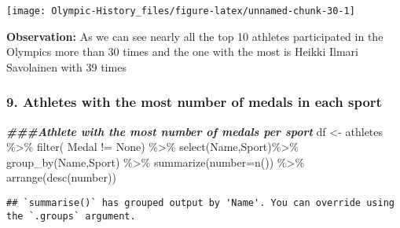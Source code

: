 \documentclass[
]{article}
\newenvironment{Shaded}{\begin{snugshade}}{\end{snugshade}}
\newcommand{\AttributeTok}[1]{\textcolor[rgb]{0.77,0.63,0.00}{#1}}
\newcommand{\DecValTok}[1]{\textcolor[rgb]{0.00,0.00,0.81}{#1}}
\newcommand{\DocumentationTok}[1]{\textcolor[rgb]{0.56,0.35,0.01}{\textbf{\textit{#1}}}}
\newcommand{\FunctionTok}[1]{\textcolor[rgb]{0.00,0.00,0.00}{#1}}
\newcommand{\NormalTok}[1]{#1}
\newcommand{\OtherTok}[1]{\textcolor[rgb]{0.56,0.35,0.01}{#1}}
\newcommand{\SpecialCharTok}[1]{\textcolor[rgb]{0.00,0.00,0.00}{#1}}
\newcommand{\StringTok}[1]{\textcolor[rgb]{0.31,0.60,0.02}{#1}}
\begin{document}
\begin{flushleft}\texttt{[image: Olympic-History\_files/figure-latex/unnamed-chunk-30-1]} \end{flushleft}

\textbf{Observation:} As we can see nearly all the top 10 athletes
participated in the Olympics more than 30 times and the one with the
most is Heikki Ilmari Savolainen with 39 times

\hypertarget{athletes-with-the-most-number-of-medals-in-each-sport}{%
\subsubsection{9. Athletes with the most number of medals in each
sport}\label{athletes-with-the-most-number-of-medals-in-each-sport}}

\begin{Shaded}
\begin{Highlighting}[]
\DocumentationTok{\#\#\#Athlete with the most number of medals per sport}
\NormalTok{df }\OtherTok{\textless{}{-}} 
\NormalTok{   athletes }\SpecialCharTok{\%\textgreater{}\%}
   \FunctionTok{filter}\NormalTok{( Medal }\SpecialCharTok{!=} \StringTok{\textquotesingle{}None\textquotesingle{}}\NormalTok{) }\SpecialCharTok{\%\textgreater{}\%}
   \FunctionTok{select}\NormalTok{(Name,Sport)}\SpecialCharTok{\%\textgreater{}\%}
   \FunctionTok{group\_by}\NormalTok{(Name,Sport) }\SpecialCharTok{\%\textgreater{}\%}
   \FunctionTok{summarize}\NormalTok{(}\AttributeTok{number=}\FunctionTok{n}\NormalTok{())  }\SpecialCharTok{\%\textgreater{}\%}
   \FunctionTok{arrange}\NormalTok{(}\FunctionTok{desc}\NormalTok{(number)) }
\end{Highlighting}
\end{Shaded}

\begin{verbatim}
## `summarise()` has grouped output by 'Name'. You can override using the `.groups` argument.
\end{verbatim}

\begin{Shaded}
\end{Shaded}
\end{document}
